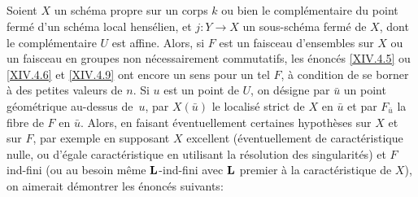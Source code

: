 \subsection{} \label{XIV.6.2}
Soient $X$ un sch\'ema propre sur un corps $k$ ou bien le compl\'ementaire du point ferm\'e d'un sch\'ema local hens\'elien, et $j:Y \to X$ un sous-sch\'ema ferm\'e de $X$, dont le compl\'ementaire $U$ est affine. Alors, si $F$ est un faisceau d'ensembles sur $X$ ou un faisceau en groupes non n\'ecessairement commutatifs, les \'enonc\'es \ref{XIV.4.5} ou \ref{XIV.4.6} et \ref{XIV.4.9} ont encore un sens pour un tel $F$, \`a condition de se borner \`a des petites valeurs de $n$. Si $u$ est un point de $U$, on d\'esigne par $\bar{u}$ un point g\'eom\'etrique au-dessus de~$u$, par $X(\bar{u})$ le localis\'e strict de $X$ en $\bar{u}$ et par $F_{\bar{u}}$ la fibre de $F$ en $\bar{u}$. Alors, en faisant \'eventuellement certaines hypoth\`eses sur $X$ et sur $F$, par exemple en supposant $X$ excellent (\'eventuellement de caract\'eristique nulle, ou d'\'egale caract\'eristique en utilisant la r\'esolution des singularit\'es) et $F$ ind-fini (ou au besoin m\^eme $\mathbf{L}$-ind-fini avec $\mathbf{L}$ premier \`a la caract\'eristique de $X$), on aimerait d\'emontrer les \'enonc\'es suivants:
